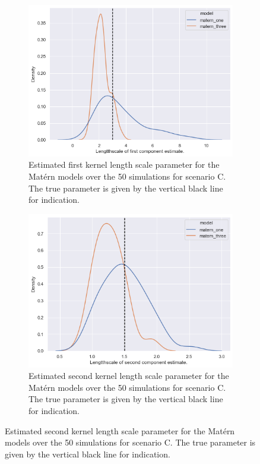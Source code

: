 \begin{figure}
	\centering
	\begin{subfigure}[b]{0.45\textwidth}
		\includegraphics[width=\textwidth]{rho_1_param_C}
		\caption{Estimated first kernel length scale parameter for the Mat\'ern models over the 50 simulations for scenario C. The true parameter is given by the vertical black line for indication.}
		\label{fig:rho_1_param_C}
	\end{subfigure}
	\hfill
	\begin{subfigure}[b]{0.45\textwidth}
		\includegraphics[width=\textwidth]{rho_2_param_C}
		\caption{Estimated second kernel length scale parameter for the Mat\'ern models over the 50 simulations for scenario C. The true parameter is given by the vertical black line for indication.}
		\label{fig:rho_2_param_C}
	\end{subfigure}
\end{figure}


